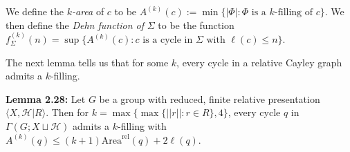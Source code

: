 \documentclass[12pt]{article}
\newcommand{\vs}{\vskip10pt}
\begin{document}
	\vs 
	
	We define the $k$\textit{-area} of $c$ to be $A^{(k)}(c) := \min \{ \vert \Phi \vert : \Phi \text{ is a } k \text{-filling of } c\}$. We then define the \textit{Dehn function of } $\Sigma$ to be the function $f^{(k)}_ {\Sigma} (n) = \sup \{A^{(k)}(c) : c \text{ is a cycle in } \Sigma \text{ with }\ell(c) \leq n\}$. 
	
	\vs 
	
	The next lemma tells us that for some $k$, every cycle in a relative Cayley graph admits a $k$-filling. 
	
	\vs 
	
	\textbf{Lemma 2.28: } Let $G$ be a group with reduced, finite relative presentation $\langle X, \mathcal{H} \vert R \rangle$. Then for $k = \max \{\max \{\vert \vert r \vert \vert : r \in R\}, 4\}$, every cycle $q$ in $\Gamma(G; X \sqcup \mathcal{H})$ admits a $k$-filling with $A^{(k)}(q) \leq (k+1) \text{Area}^{\text{rel}}(q) + 2 \ell (q)$. 
	
\end{document}
